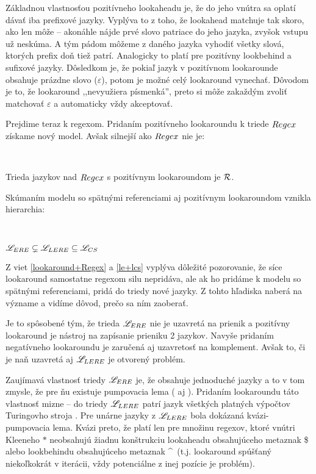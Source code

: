 Základnou vlastnosťou pozitívneho lookaheadu je, že do jeho vnútra sa oplatí dávať iba prefixové jazyky. Vyplýva to z toho, že lookahead matchuje tak skoro, ako len môže -- akonáhle nájde prvé slovo patriace do jeho jazyka, zvyšok vstupu už neskúma. A tým pádom môžeme z daného jazyka vyhodiť všetky slová, ktorých prefix doň tiež patrí. Analogicky to platí pre pozitívny lookbehind a sufixové jazyky. Dôsledkom je, že pokiaľ jazyk v pozitívnom lookarounde obsahuje prázdne slovo ($\varepsilon$), potom je možné celý lookaround vynechať. Dôvodom je to, že lookaround ,,nevyužiera písmenká'', preto si môže zakaždým zvoliť matchovať $\varepsilon$ a automaticky vždy akceptovať.

Prejdime teraz k regexom. Pridaním pozitívneho lookaroundu k triede $Regex$ získame nový model. Avšak silnejší ako $Regex$ nie je:
\begin{veta} \textbf{\emph{\cite[Veta 2.2.10.]{mojaBak}}}\label{lookaround+Regex} \ \par
Trieda jazykov nad $Regex$ s pozitívnym lookaroundom je ${\cal R}$.
\end{veta}

Skúmaním modelu so spätnými referenciami aj pozitívnym lookaroundom vznikla hierarchia:
\begin{veta}\textbf{\emph{\cite[Vety 2.2.13 a 2.2.14.]{mojaBak}}}\label{le+lcs} \ \par
$ \mathscr{L}_{ERE} \subsetneq \mathscr{L}_{LERE} \subseteq \mathscr{L}_{CS} $
\end{veta}

Z viet \ref{lookaround+Regex} a \ref{le+lcs} vyplýva dôležité pozorovanie, že síce lookaround samostatne regexom silu nepridáva, ale ak ho pridáme k modelu so spätnými referenciami, pridá do triedy nové jazyky. Z tohto hľadiska naberá na význame a vidíme dôvod, prečo sa ním zaoberať.

Je to spôsobené tým, že trieda $\mathscr{L}_{ERE}$ nie je uzavretá na prienik \cite{ExtendedRegexIntersec} a pozitívny lookaround je nástroj na zapísanie prieniku 2 jazykov. Navyše pridaním negatívneho lookaroundu je zaručená aj uzavretosť na komplement. Avšak to, či je naň uzavretá aj $\mathscr{L}_{LERE}$ je otvorený problém.

Zaujímavá vlastnosť triedy $\mathscr{L}_{ERE}$ je, že obsahuje jednoduché jazyky a to v tom zmysle, že pre ňu existuje pumpovacia lema (\cite{ExtendedRegexPower} aj \cite{ExtendedRegexIntersec}). Pridaním look\-aroundu táto vlastnosť mizne -- do triedy $\mathscr{L}_{LERE}$ patrí jazyk všetkých platných výpočtov Turingovho stroja \cite[Veta 2.2.16.]{mojaBak}. Pre unárne jazyky z $\mathscr{L}_{LERE}$ bola dokázaná kvázi-pumpovacia lema. Kvázi preto, že platí len pre množinu regexov, ktoré vnútri Kleeneho $*$ neobsahujú žiadnu konštrukciu lookaheadu obsahujúceho metaznak \$ alebo lookbehindu obsahujúceho metaznak \textasciicircum ~(t.j. lookaround spúšťaný niekoľkokrát v iterácii, vždy potenciálne z inej pozície je problém).


